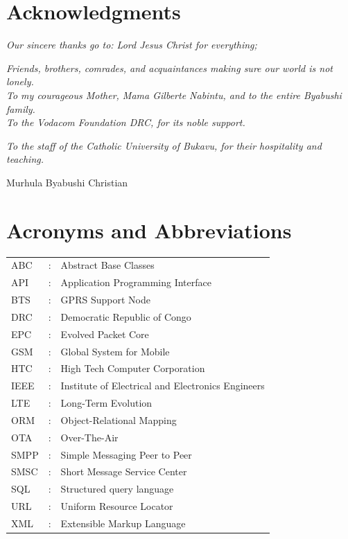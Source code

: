 \documentclass[12pt,a4paper, oneside]{book}
\begin{document}
\chapter{Acknowledgments} 
\begin{center}
	\textit{Our sincere thanks go to:
	\vspace{0.3cm}
	Lord Jesus Christ for everything;\\
	\vspace{0.3cm}	}
		
\textit{	Friends, brothers, comrades, and acquaintances making sure our world is not lonely.\\
	\vspace{0.3cm}	
		}
\textit{	To my courageous Mother, Mama Gilberte Nabintu, and to the entire Byabushi family.\\
		\vspace{0.3cm}	
		}
\textit{	To the Vodacom Foundation DRC, for its noble support.\\
		\vspace{0.3cm}}	
		
\textit{	To the staff of the Catholic University of Bukavu, for their hospitality and teaching.\\}
	
	\vspace{12cm} \begin{flushright}
	Murhula Byabushi Christian
	\end{flushright}
\end{center}

\chapter{Acronyms and Abbreviations}  
\begin{table}[h]
\renewcommand{\arraystretch}{1.2}
\begin{tabular}{p{1cm}p{1cm}p{9cm}}
ABC &:&	Abstract Base Classes\\
API &:&Application Programming Interface\\
BTS&:&	GPRS Support Node\\
DRC & :  &	Democratic Republic of Congo\\
EPC	&: &Evolved Packet Core\\
GSM &:	&Global System for Mobile\\
HTC	&:& High Tech Computer Corporation\\
IEEE &:&	Institute of Electrical and Electronics Engineers\\
LTE	&:& Long-Term Evolution\\
ORM &: &Object-Relational Mapping\\
OTA	&: & Over-The-Air\\
SMPP &:&	Simple Messaging Peer to Peer\\
SMSC &:&	Short Message Service Center\\
SQL	&:& Structured query language\\
URL&: & Uniform Resource Locator\\
XML	&:& Extensible Markup Language\\
\end{tabular}
\end{table}
\listoffigures
\end{document}
